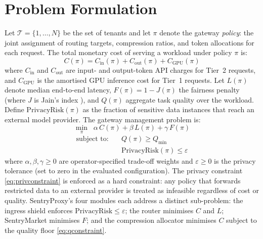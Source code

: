 \documentclass[conference]{IEEEtran}
\begin{document}
\section{Problem Formulation}
\label{sec:formulation}

Let $\mathcal{T} = \{1,\ldots,N\}$ be the set of tenants and let $\pi$ denote the gateway \textit{policy}: the joint assignment of routing targets, compression ratios, and token allocations for each request. The total monetary cost of serving a workload under policy $\pi$ is:
\begin{equation}
C(\pi) = C_{\text{in}}(\pi) + C_{\text{out}}(\pi) + C_{\text{GPU}}(\pi)
\label{eq:cost}
\end{equation}
where $C_{\text{in}}$ and $C_{\text{out}}$ are input- and output-token API charges for Tier~2 requests, and $C_{\text{GPU}}$ is the amortised GPU inference cost for Tier~1 requests. Let $L(\pi)$ denote median end-to-end latency, $F(\pi) = 1 - J(\pi)$ the fairness penalty (where $J$ is Jain's index \cite{b_jain}), and $Q(\pi)$ aggregate task quality over the workload. Define $\text{PrivacyRisk}(\pi)$ as the fraction of sensitive data instances that reach an external model provider. The gateway management problem is:
\begin{equation}
\min_{\pi} \;\; \alpha\, C(\pi) + \beta\, L(\pi) + \gamma\, F(\pi)
\label{eq:opt}
\end{equation}
\vspace{-0.5em}
\begin{align}
\text{subject to:} \quad &Q(\pi) \geq Q_{\min} \label{eq:qconstraint} \\
                         &\text{PrivacyRisk}(\pi) \leq \varepsilon \label{eq:privconstraint}
\end{align}
where $\alpha, \beta, \gamma \geq 0$ are operator-specified trade-off weights and $\varepsilon \geq 0$ is the privacy tolerance (set to zero in the evaluated configuration). The privacy constraint \eqref{eq:privconstraint} is enforced as a hard constraint: any policy that forwards restricted data to an external provider is treated as infeasible regardless of cost or quality. SentryProxy's four modules each address a distinct sub-problem: the ingress shield enforces $\text{PrivacyRisk} \leq \varepsilon$; the router minimises $C$ and $L$; SentryMarket minimises $F$; and the compression allocator minimises $C$ subject to the quality floor \eqref{eq:qconstraint}.

\end{document}
